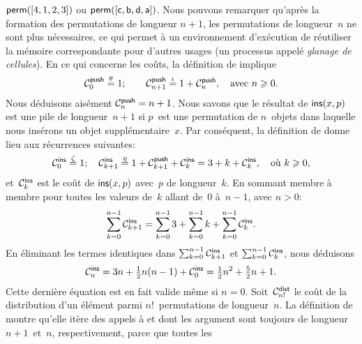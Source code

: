 \(\fun{perm}([4,1,2,3])\) ou \(\fun{perm}([\fun{c}, \fun{b}, \fun{d},
\fun{a}])\). Nous pouvons remarquer qu'après la formation des
permutations de longueur \(n+1\), les permutations de longueur~\(n\)
ne sont plus nécessaires, ce qui permet à un environnement d'exécution
de réutiliser la mémoire correspondante pour d'autres usages (un
processus appelé \emph{glanage de cellules}). En ce qui concerne les coûts, la définition de
 implique
\begin{equation*}
\C{\fun{push}}{0} \eqn{\theta} 1;\qquad
\C{\fun{push}}{n+1} \eqn{\iota} 1 + \C{\fun{push}}{n},\quad
\text{avec \(n \geqslant 0\)}.
\end{equation*}
Nous déduisons aisément \(\C{\fun{push}}{n} = n +
1\). Nous savons que le résultat de
\(\fun{ins}(x,p)\) est une pile de longueur~\(n+1\) si \(p\)~est une
permutation de \(n\)~objets dans laquelle nous insérons un objet
supplémentaire~\(x\). Par conséquent, la définition de 
donne lieu aux récurrences suivantes:
\begin{equation*}
\C{\fun{ins}}{0}   \eqn{\zeta} 1;\quad
\C{\fun{ins}}{k+1} \eqn{\eta} 1 + \C{\fun{push}}{k+1} +
\C{\fun{ins}}{k} = 3 + k + \C{\fun{ins}}{k}, \quad \text{où \(k
                    \geqslant 0\)},
\end{equation*}
et~\(\C{\fun{ins}}{k}\) est le coût de \(\fun{ins}(x,p)\) avec~\(p\)
de longueur~\(k\). En sommant membre à membre pour toutes les valeurs
de~\(k\) allant de~\(0\) à~\(n-1\), avec \({n>0}\):
\begin{equation*}
\sum_{k=0}^{n-1}{\C{\fun{ins}}{k+1}}
  = \sum_{k=0}^{n-1}{3} + \sum_{k=0}^{n-1}{k}
     + \sum_{k=0}^{n-1}{\C{\fun{ins}}{k}}.
\end{equation*}
En éliminant les termes identiques dans
\(\sum_{k=0}^{n-1}{\C{\fun{ins}}{k+1}}\) et
\(\sum_{k=0}^{n-1}{\C{\fun{ins}}{k}}\), nous
déduisons
\begin{equation*}
\C{\fun{ins}}{n}
  = 3n + \tfrac{1}{2}n(n-1) + \C{\fun{ins}}{0}
  = \tfrac{1}{2}{n^2} + \tfrac{5}{2}{n} + 1.
\end{equation*}
Cette dernière équation est en fait valide même si \({n = 0}\).
Soit~\(\C{\fun{dist}}{n!}\) le coût de la distribution d'un élément
parmi \(n!\)~permutations de longueur~\(n\). La définition de
 montre qu'elle itère des appels
à  et
 dont les argument sont toujours de
longueur \(n+1\)~et~\(n\), respectivement, parce que toutes les
